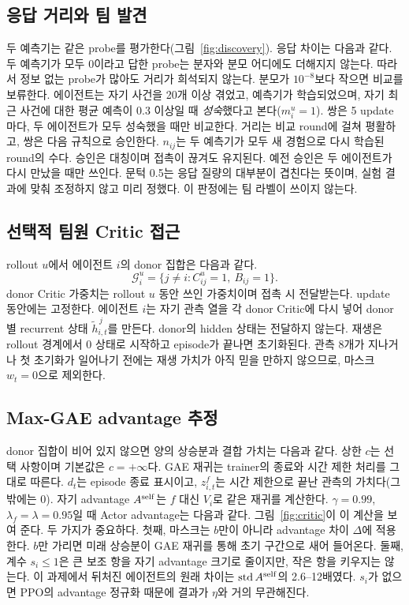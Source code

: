 \documentclass[10pt,twocolumn,letterpaper]{article}
\begin{document}
\subsection{응답 거리와 팀 발견}
두 예측기는 같은 probe를 평가한다(그림~\ref{fig:discovery}). 응답 차이는 다음과 같다.
\DistanceEquation
두 예측기가 모두 0이라고 답한 probe는 분자와 분모 어디에도 더해지지 않는다. 따라서 정보 없는 probe가 많아도 거리가 희석되지 않는다. 분모가 $10^{-8}$보다 작으면 비교를 보류한다. 에이전트는 자기 사건을 20개 이상 겪었고, 예측기가 학습되었으며, 자기 최근 사건에 대한 평균 예측이 0.3 이상일 때 \emph{성숙}했다고 본다($m_i^u=1$). 쌍은 5 update마다, 두 에이전트가 모두 성숙했을 때만 비교한다. 거리는 비교 round에 걸쳐 평활하고, 쌍은 다음 규칙으로 승인한다.
\ApprovalEquation
$n_{ij}$는 두 예측기가 모두 새 경험으로 다시 학습된 round의 수다. 승인은 대칭이며 접촉이 끊겨도 유지된다. 예전 승인은 두 에이전트가 다시 만났을 때만 쓰인다. 문턱 0.5는 응답 질량의 대부분이 겹친다는 뜻이며, 실험 결과에 맞춰 조정하지 않고 미리 정했다. 이 판정에는 팀 라벨이 쓰이지 않는다.

\subsection{선택적 팀원 Critic 접근}
rollout $u$에서 에이전트 $i$의 donor 집합은 다음과 같다.
\begin{equation}\label{eq:donorset}
\mathcal G_i^u=\{j\ne i: C_{ij}^u=1,\ B_{ij}=1\}.
\end{equation}
donor Critic 가중치는 rollout $u$ 동안 쓰인 가중치이며 접촉 시 전달받는다. update 동안에는 고정한다. 에이전트 $i$는 자기 관측 열을 각 donor Critic에 다시 넣어 donor별 recurrent 상태 $\tilde h^{\,j}_{i,t}$를 만든다. donor의 hidden 상태는 전달하지 않는다. 재생은 rollout 경계에서 0 상태로 시작하고 episode가 끝나면 초기화된다. 관측 8개가 지나거나 첫 초기화가 일어나기 전에는 재생 가치가 아직 믿을 만하지 않으므로, 마스크 $w_t=0$으로 제외한다.

\subsection{Max-GAE advantage 추정}
donor 집합이 비어 있지 않으면 양의 상승분과 결합 가치는 다음과 같다.
\MaxEquation
상한 $c$는 선택 사항이며 기본값은 $c=+\infty$다. GAE 재귀는 trainer의 종료와 시간 제한 처리를 그대로 따른다.
\GAEEquation
$d_t$는 episode 종료 표시이고, $z^f_{i,t}$는 시간 제한으로 끝난 관측의 가치다(그 밖에는 0). 자기 advantage $A^{\rm self}$는 $f$ 대신 $V_i$로 같은 재귀를 계산한다. $\gamma=0.99$, $\lambda_f=\lambda=0.95$일 때 Actor advantage는 다음과 같다.
\BlendEquation
그림~\ref{fig:critic}이 이 계산을 보여 준다. 두 가지가 중요하다. 첫째, 마스크는 $b$만이 아니라 advantage 차이 $\Delta$에 적용한다. $b$만 가리면 미래 상승분이 GAE 재귀를 통해 초기 구간으로 새어 들어온다. 둘째, 계수 $s_i\le1$은 큰 보조 항을 자기 advantage 크기로 줄이지만, 작은 항을 키우지는 않는다. 이 과제에서 뒤처진 에이전트의 원래 차이는 $\operatorname{std}A^{\rm self}$의 2.6--12배였다. $s_i$가 없으면 PPO의 advantage 정규화 때문에 결과가 $\eta$와 거의 무관해진다.
\end{document}
